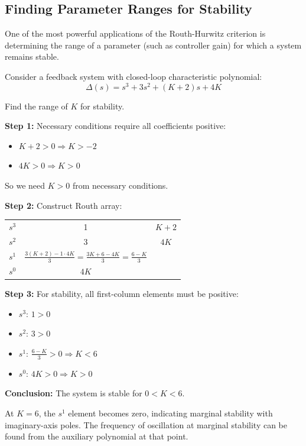 \subsection{Finding Parameter Ranges for Stability}

One of the most powerful applications of the Routh-Hurwitz criterion is determining the range of a parameter (such as controller gain) for which a system remains stable.

\begin{example}
\label{ex:routh_parameter}
Consider a feedback system with closed-loop characteristic polynomial:
\begin{equation}
\Delta(s) = s^3 + 3s^2 + (K+2)s + 4K
\end{equation}

Find the range of $K$ for stability.

\textbf{Step 1:} Necessary conditions require all coefficients positive:
\begin{itemize}
    \item $K + 2 > 0 \Rightarrow K > -2$
    \item $4K > 0 \Rightarrow K > 0$
\end{itemize}

So we need $K > 0$ from necessary conditions.

\textbf{Step 2:} Construct Routh array:
\begin{center}
\begin{tabular}{c|cc}
$s^3$ & 1 & $K+2$ \\
$s^2$ & 3 & $4K$ \\
$s^1$ & $\frac{3(K+2) - 1 \cdot 4K}{3} = \frac{3K + 6 - 4K}{3} = \frac{6-K}{3}$ & \\
$s^0$ & $4K$ &
\end{tabular}
\end{center}

\textbf{Step 3:} For stability, all first-column elements must be positive:
\begin{itemize}
    \item $s^3$: $1 > 0$ \checkmark
    \item $s^2$: $3 > 0$ \checkmark
    \item $s^1$: $\frac{6-K}{3} > 0 \Rightarrow K < 6$
    \item $s^0$: $4K > 0 \Rightarrow K > 0$
\end{itemize}

\textbf{Conclusion:} The system is stable for $\boxed{0 < K < 6}$.

At $K = 6$, the $s^1$ element becomes zero, indicating marginal stability with imaginary-axis poles. The frequency of oscillation at marginal stability can be found from the auxiliary polynomial at that point.
\end{example}

